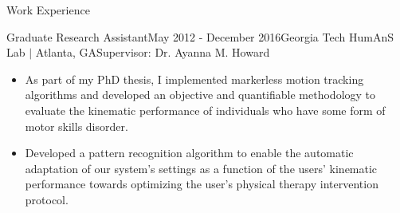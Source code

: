 \documentclass{resume} %
\begin{document}
\begin{rSection}{Work Experience}
\begin{rSubsection}{Graduate Research Assistant}{May 2012 - December 2016}{Georgia Tech HumAnS Lab $\vert$ Atlanta, GA}{Supervisor: Dr. Ayanna M. Howard}
\item
\begin{itemize}

\item As part of my PhD thesis, I implemented markerless motion tracking
  algorithms and developed an objective and quantifiable methodology to
  evaluate the kinematic performance of individuals who have some form of motor
  skills disorder.

\item Developed a pattern recognition algorithm to enable the automatic
  adaptation of our system's settings as a function of the users' kinematic
  performance towards optimizing the user's physical therapy intervention
  protocol.

\end{itemize}

\end{rSubsection}


\iffalse
\begin{rSubsection}{Graduate Research Assistant}{August 2011 - May 2012}{Georgia Tech MRL Lab $\vert$ Atlanta, GA}{Supervisor: Dr. Ronald C. Arkin}

\item
\begin{itemize}

\item Implemented the architecture and support for knowledge sharing across
  heterogeneous robotic agents as part of the MAST (Micro Autonomous Systems
  Technology) project.


\end{itemize}

\end{rSubsection}
\fi


\end{rSection}





\end{document}
